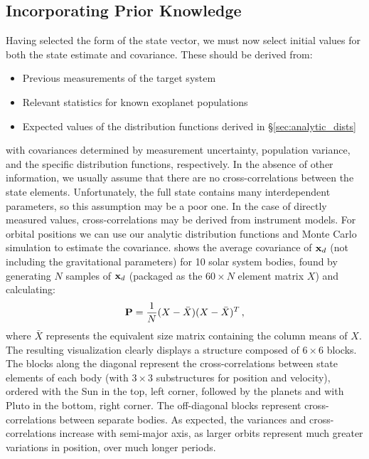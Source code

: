 \subsection{Incorporating Prior Knowledge}\label{sec:state_init_apri}
Having selected the form of the state vector, we must now select initial values for both the state estimate and covariance.  These should be derived from:
\begin{itemize}
\item Previous measurements of the target system
\item Relevant statistics for known exoplanet populations
\item Expected values of the distribution functions derived in \S\ref{sec:analytic_dists}
\end{itemize}
with covariances determined by measurement uncertainty, population variance, and the specific distribution functions, respectively.  In the absence of other information, we usually assume that there are no cross-correlations between the state elements.  Unfortunately, the full state contains many interdependent parameters, so this assumption may be a poor one.  In the case of directly measured values, cross-correlations may be derived from instrument models.  For orbital positions we can use our analytic distribution functions and Monte Carlo simulation to estimate the covariance.   shows the average covariance of $\mathbf x_d$ (not including the gravitational parameters) for 10 solar system bodies, found by generating $N$ samples of $\mathbf x_d$ (packaged as the $60 \times N$ element matrix  $X$) and calculating:
\begin{equation}\label{eq:covEst}
\mathbf P = \frac{1}{N} (X - \bar{X})(X - \bar{X})^T \,,
\end{equation}
where $\bar X$ represents the equivalent size matrix containing the column means of $X$.  The resulting visualization clearly displays a structure composed of $6 \times 6$ blocks.  The blocks along the diagonal represent the cross-correlations between state elements of each body (with $3 \times 3$ substructures for position and velocity), ordered with the Sun in the top, left corner, followed by the planets and with Pluto in the bottom, right corner.  The off-diagonal blocks represent cross-correlations between separate bodies.  As expected, the variances and cross-correlations increase with semi-major axis, as larger orbits represent much greater variations in position, over much longer periods.
